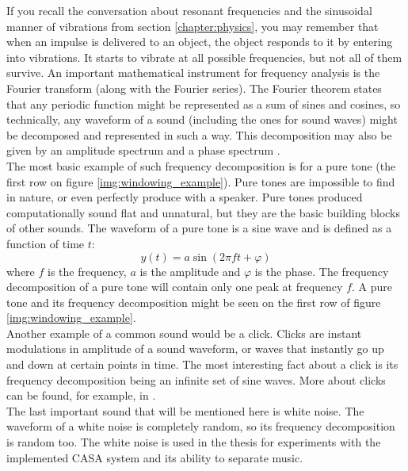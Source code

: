 If you recall the conversation about resonant frequencies and the sinusoidal manner of vibrations from section \ref{chapter:physics}, you may remember that when an impulse is delivered to an object, the object responds to it by entering into vibrations. It starts to vibrate at all possible frequencies, but not all of them survive. An important mathematical instrument for frequency analysis is the Fourier transform (along with the Fourier series). The Fourier theorem states that any periodic function might be represented as a sum of sines and cosines, so technically, any waveform of a sound (including the ones for sound waves) might be decomposed and represented in such a way. This decomposition may also be given by an amplitude spectrum and a phase spectrum \cite{Schnupp2011}.\\

The most basic example of such frequency decomposition is for a pure tone (the first row on figure \ref{img:windowing_example}). Pure tones are impossible to find in nature, or even perfectly produce with a speaker. Pure tones produced computationally sound flat and unnatural, but they are the basic building blocks of other sounds. The waveform of a pure tone is a sine wave and is defined as a function of time $t$:
\begin{equation}
	y(t) = a\sin(2\pi{}ft + \varphi)
\end{equation}
where $f$ is the frequency, $a$ is the amplitude and $\varphi$ is the phase. The frequency decomposition of a pure tone will contain only one peak at frequency $f$. A pure tone and its frequency decomposition might be seen on the first row of figure \ref{img:windowing_example}.\\

Another example of a common sound would be a click. Clicks are instant modulations in amplitude of a sound waveform, or waves that instantly go up and down at certain points in time. The most interesting fact about a click is its frequency decomposition being an infinite set of sine waves. More about clicks can be found, for example, in \cite{Schnupp2011}.\\

The last important sound that will be mentioned here is white noise. The waveform of a white noise is completely random, so its frequency decomposition is random too. The white noise is used in the thesis for experiments with the implemented CASA system and its ability to separate music.\\

